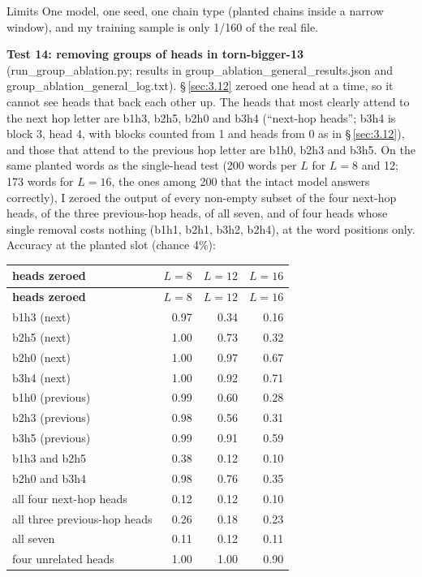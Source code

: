 \documentclass[paper=a4,fontsize=11pt,DIV=11,parskip=half,headings=small,numbers=noendperiod]{scrartcl}
\DeclareRobustCommand{\lead}[1]{\textsf{\bfseries\color{accent}#1}}
\DeclareRobustCommand{\code}[1]{{\fontseries{m}\ttfamily #1}}
\DeclareRobustCommand{\hdr}[1]{\textsf{\bfseries #1}}
\begin{document}
\begin{limbox}{Limits}
One model, one seed, one chain type (planted chains inside a narrow window), and my training sample is only
1/160 of the real file.
\end{limbox}

\lead{Test 14: removing groups of heads in \code{torn-\allowbreak{}bigger-\allowbreak{}13}}
(\code{run\_\allowbreak{}group\_\allowbreak{}ablation.\allowbreak{}py}; results in
\code{group\_\allowbreak{}ablation\_\allowbreak{}general\_\allowbreak{}results.\allowbreak{}json} and
\code{group\_\allowbreak{}ablation\_\allowbreak{}general\_\allowbreak{}log.\allowbreak{}txt}).
\S\,\ref{sec:3.12} zeroed one head at a time, so it cannot see heads that back each other up. The heads that
most clearly attend to the next hop letter are b1h3, b2h5, b2h0 and b3h4 (“next-hop heads”; b3h4 is block 3,
head 4, with blocks counted from 1 and heads from 0 as in \S\,\ref{sec:3.12}), and those that attend to the
previous hop letter are b1h0, b2h3 and b3h5. On the same planted words as the single-head test (200 words per
$L$ for $L=8$ and 12; 173 words for $L=16$, the ones among 200 that the intact model answers correctly), I
zeroed the output of every non-empty subset of the four next-hop heads, of the three previous-hop heads, of all
seven, and of four heads whose single removal costs nothing (b1h1, b2h1, b3h2, b2h4), at the word positions
only. Accuracy at the planted slot (chance 4\%):

{\small\nopagebreak[4]
\begin{longtable}{@{}l r r r@{}}
\toprule
\hdr{heads zeroed} & \hdr{$L=8$} & \hdr{$L=12$} & \hdr{$L=16$} \\
\midrule
\endfirsthead
\toprule
\hdr{heads zeroed} & \hdr{$L=8$} & \hdr{$L=12$} & \hdr{$L=16$} \\
\midrule
\endhead
\bottomrule
\endlastfoot
b1h3 (next) & 0.97 & 0.34 & 0.16 \\
b2h5 (next) & 1.00 & 0.73 & 0.32 \\
b2h0 (next) & 1.00 & 0.97 & 0.67 \\
b3h4 (next) & 1.00 & 0.92 & 0.71 \\
b1h0 (previous) & 0.99 & 0.60 & 0.28 \\
b2h3 (previous) & 0.98 & 0.56 & 0.31 \\
b3h5 (previous) & 0.99 & 0.91 & 0.59 \\
b1h3 and b2h5 & 0.38 & 0.12 & 0.10 \\
b2h0 and b3h4 & 0.98 & 0.76 & 0.35 \\
all four next-hop heads & 0.12 & 0.12 & 0.10 \\
all three previous-hop heads & 0.26 & 0.18 & 0.23 \\
all seven & 0.11 & 0.12 & 0.11 \\
four unrelated heads & 1.00 & 1.00 & 0.90 \\
\end{longtable}}
\end{document}
